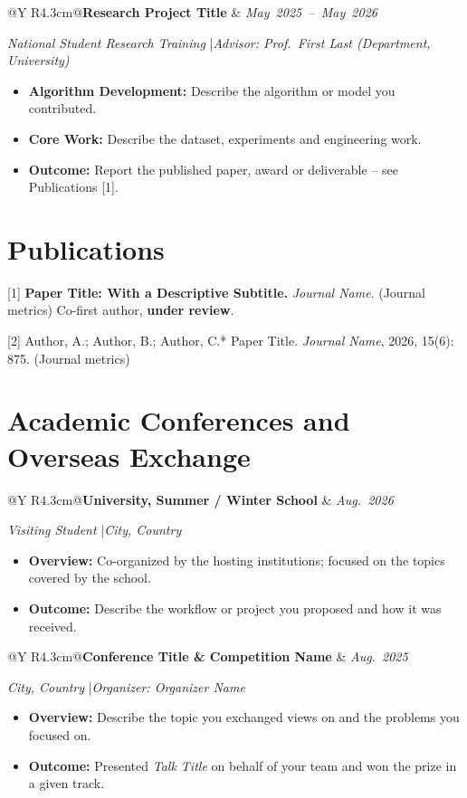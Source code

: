 \documentclass[11pt,a4paper]{article}
\makeatletter
\newcommand{\cvline}[2]{%
  \par\addvspace{2.5pt}%
  \begin{tabularx}{\textwidth}{@{}Y R{4.3cm}@{}}#1 & #2\end{tabularx}}
\newenvironment{cvitems}
  {\begin{itemize}[leftmargin=1.5em,itemsep=1pt,topsep=1pt,parsep=0pt,partopsep=0pt,label=\textbullet]}
  {\end{itemize}}
\makeatother
\begin{document}
\cvline{\textbf{Research Project Title}}{\mbox{\textit{May 2025 -- May 2026}}}
\textit{National Student Research Training} \quad|\quad \textit{Advisor: Prof.\ First Last (Department, University)}
\begin{cvitems}
  \item \textbf{Algorithm Development:} Describe the algorithm or model you contributed.
  \item \textbf{Core Work:} Describe the dataset, experiments and engineering work.
  \item \textbf{Outcome:} Report the published paper, award or deliverable -- see Publications [1].
\end{cvitems}

\section*{Publications}

[1] \textbf{Paper Title: With a Descriptive Subtitle.} \textit{Journal Name}. (Journal metrics) Co-first author, \textbf{under review}.

[2] Author, A.; Author, B.; Author, C.* Paper Title. \textit{Journal Name}, 2026, 15(6): 875. (Journal metrics)

\section*{Academic Conferences and Overseas Exchange}

\cvline{\textbf{University, Summer / Winter School}}{\mbox{\textit{Aug. 2026}}}
\textit{Visiting Student} \quad|\quad \textit{City, Country}
\begin{cvitems}
  \item \textbf{Overview:} Co-organized by the hosting institutions; focused on the topics covered by the school.
  \item \textbf{Outcome:} Describe the workflow or project you proposed and how it was received.
\end{cvitems}

\cvline{\textbf{Conference Title \& Competition Name}}{\mbox{\textit{Aug. 2025}}}
\textit{City, Country} \quad|\quad \textit{Organizer: Organizer Name}
\begin{cvitems}
  \item \textbf{Overview:} Describe the topic you exchanged views on and the problems you focused on.
  \item \textbf{Outcome:} Presented \textit{Talk Title} on behalf of your team and won the prize in a given track.
\end{cvitems}
\end{document}
